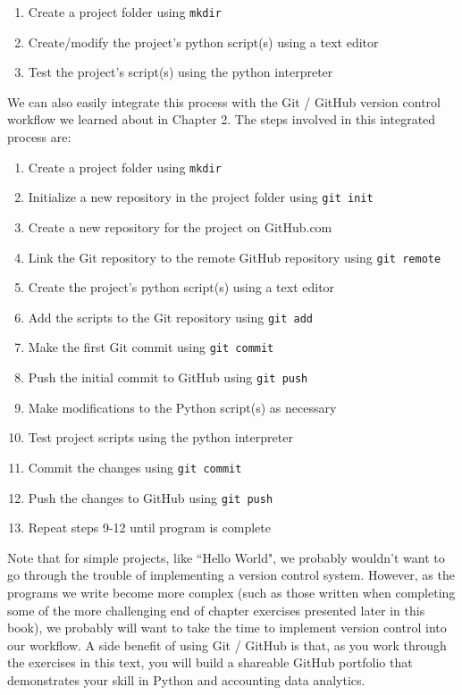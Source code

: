\documentclass{book}
\begin{document}
\begin{enumerate}
	\item Create a project folder using \texttt{mkdir}
	\item Create/modify the project's python script(s) using a text editor
	\item Test the project's script(s) using the python interpreter
\end{enumerate}

We can also easily integrate this process with the Git / GitHub version control workflow we learned about in Chapter 2. The steps involved in this integrated process are:

\begin{enumerate}
	\item Create a project folder using \texttt{mkdir}
	\item Initialize a new repository in the project folder using \texttt{git init}
	\item Create a new repository for the project on GitHub.com
	\item Link the Git repository to the remote GitHub repository using \texttt{git remote}
	\item Create the project's python script(s) using a text editor
	\item Add the scripts to the Git repository using \texttt{git add}
	\item Make the first Git commit using \texttt{git commit}
	\item Push the initial commit to GitHub using \texttt{git push}
	\item Make modifications to the Python script(s) as necessary
	\item Test project scripts using the python interpreter
	\item Commit the changes using \texttt{git commit}
	\item Push the changes to GitHub using \texttt{git push}
	\item Repeat steps 9-12 until program is complete
\end{enumerate}

Note that for simple projects, like ``Hello World", we probably wouldn't want to go through the trouble of implementing a version control system. However, as the programs we write become more complex (such as those written when completing some of the more challenging end of chapter exercises presented later in this book), we probably will want to take the time to implement version control into our workflow. A side benefit of using Git / GitHub is that, as you work through the exercises in this text, you will build a shareable GitHub portfolio that demonstrates your skill in Python and accounting data analytics. 
\end{document}
